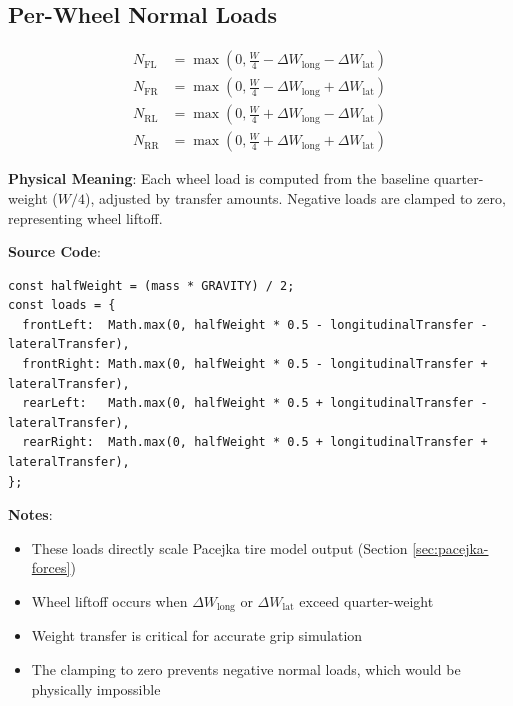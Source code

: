 \subsection{Per-Wheel Normal Loads}

\begin{align}
  N_{\text{FL}} &= \max\left(0, \frac{W}{4} - \Delta W_{\text{long}} - \Delta W_{\text{lat}}\right) \\
  N_{\text{FR}} &= \max\left(0, \frac{W}{4} - \Delta W_{\text{long}} + \Delta W_{\text{lat}}\right) \\
  N_{\text{RL}} &= \max\left(0, \frac{W}{4} + \Delta W_{\text{long}} - \Delta W_{\text{lat}}\right) \\
  N_{\text{RR}} &= \max\left(0, \frac{W}{4} + \Delta W_{\text{long}} + \Delta W_{\text{lat}}\right)
  \label{eq:wheel-loads}
\end{align}

\textbf{Physical Meaning}: Each wheel load is computed from the baseline quarter-weight ($W/4$), adjusted by transfer amounts. Negative loads are clamped to zero, representing wheel liftoff.

\textbf{Source Code}: 

\begin{lstlisting}[caption={Per-wheel normal load computation}]
const halfWeight = (mass * GRAVITY) / 2;
const loads = {
  frontLeft:  Math.max(0, halfWeight * 0.5 - longitudinalTransfer - lateralTransfer),
  frontRight: Math.max(0, halfWeight * 0.5 - longitudinalTransfer + lateralTransfer),
  rearLeft:   Math.max(0, halfWeight * 0.5 + longitudinalTransfer - lateralTransfer),
  rearRight:  Math.max(0, halfWeight * 0.5 + longitudinalTransfer + lateralTransfer),
};
\end{lstlisting}

\textbf{Notes}:
\begin{itemize}
  \item These loads directly scale Pacejka tire model output (Section \ref{sec:pacejka-forces})
  \item Wheel liftoff occurs when $\Delta W_{\text{long}}$ or $\Delta W_{\text{lat}}$ exceed quarter-weight
  \item Weight transfer is critical for accurate grip simulation
  \item The clamping to zero prevents negative normal loads, which would be physically impossible
\end{itemize}

\newpage
